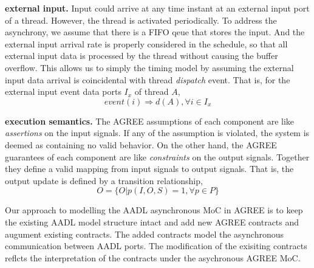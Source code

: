 {\bf external input.} 
Input could arrive at any time instant at an external input port of a thread. However, the thread is activated periodically. To address the asynchrony, we assume that there is a FIFO qeue that stores the input. And the external input arrival rate is properly considered in the schedule, so that all external input data is processed by the thread without causing the buffer overflow. This allows us to simply the timing model by assuming the external input data arrival is coincidental with thread \emph{dispatch} event. That is, for the external input event data ports $I_x$ of thread $A$, 
$$ event(i) \Rightarrow d(A), \forall i \in I_x $$

{\bf execution semantics.}
The AGREE assumptions of each component are like \emph{assertions} on the input signals. If any of the assumption is violated, the system is deemed as containing no valid behavior. On the other hand, the AGREE guarantees of each component are like \emph{constraints} on the output signals. Together they define a valid mapping from input signals to output signals. That is,  the output update is defined by a transition relationship, 
$$ O = \{O | p(I, O, S) = 1, \forall p \in P\} $$ 





Our approach to modelling the AADL asynchronous MoC in AGREE is to keep the existing AADL model structure intact and add new AGREE contracts and augument existing contracts. The added contracts model the asynchronous communication between AADL ports. The modification of the exisiting contracts reflcts the interpretation of the contracts under the asychronous AGREE MoC. 



